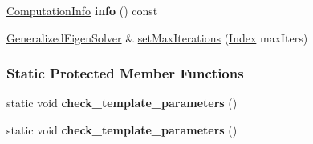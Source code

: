 \begin{DoxyCompactItemize}
\mbox{\label{group___eigenvalues___module_aad204fd80e2633d5693b78916bcda40c}} 
\hyperlink{group__enums_ga85fad7b87587764e5cf6b513a9e0ee5e}{Computation\+Info} {\bfseries info} () const
\item 
\hyperlink{group___eigenvalues___module_class_eigen_1_1_generalized_eigen_solver}{Generalized\+Eigen\+Solver} \& \hyperlink{group___eigenvalues___module_a2a6f96bd042068cfc0eafba839b424bd}{set\+Max\+Iterations} (\hyperlink{group___eigenvalues___module_a46a0ff3841059479ec314e56a5645302}{Index} max\+Iters)
\end{DoxyCompactItemize}
\subsubsection*{Static Protected Member Functions}
\begin{DoxyCompactItemize}
\item 
\mbox{\label{group___eigenvalues___module_a8540388c4be7dbdd1da819e1a84d3a64}} 
static void {\bfseries check\+\_\+template\+\_\+parameters} ()
\item 
\mbox{\label{group___eigenvalues___module_a8540388c4be7dbdd1da819e1a84d3a64}} 
static void {\bfseries check\+\_\+template\+\_\+parameters} ()
\end{DoxyCompactItemize}

